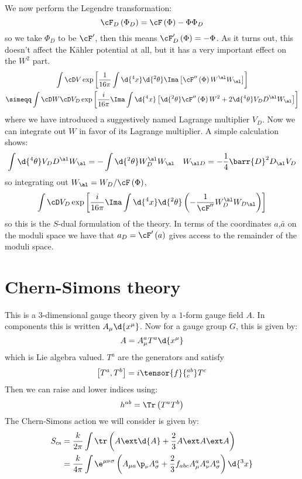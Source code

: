 \documentclass{booc}
\begin{document}
We now perform the Legendre transformation:
\begin{equation}
\cF_D\left( \Phi_D \right) = \cF\left( \Phi \right) - \Phi \Phi_D
\end{equation}
so we take $\Phi_D$ to be $\cF'$,
then this means $\cF'_D\left( \Phi \right) = -\Phi$.
As it turns out, this doesn't affect the K\"ahler potential at all,
but it has a very important effect on the $W^2$ part.
\begin{multline}
\int \cD V
\exp\left[ 
\frac{1}{16\pi}\int \d{^4 x}\d{^2 \theta} \Ima\left[ \cF''\left( \Phi \right)W^\al W_\al \right]\right]
\\ \simeqq
\int \cD W \cD V_D \exp\left[ \frac{i}{16\pi} \Ima\int
\d{^4 x}\left[ \d{^2 \theta} \cF''\left( \Phi \right)W^2 + 2 \d{^4 \theta}V_D D^\al W_\al \right]\right]
\end{multline}
where we have introduced a suggestively named Lagrange multiplier $V_D$.
Now we can integrate out $W$ in favor of its Lagrange multiplier.
A simple calculation shows:
\begin{align}
\int \d{^4 \theta} V_D D^\al W_\al = - \int \d{^2 \theta} W_D^\al W_\al
&&
W_{\al D} = -\frac{1}{4} \barr{D}^2 D_\al V_D
\end{align}
so integrating out $W_\al = W_D/ \cF\left( \Phi \right)$, 
\begin{equation}
\int \cD V_D \exp\left[ \frac{i}{16\pi} \Ima\int \d{^4 x}\d{^2 \theta}
\left( -\frac{1}{\cF ''} W_D^\al W_{D\al} \right)\right]
\end{equation}
so this is the $S$-dual formulation of the theory.
In terms of the coordinates $a$,$\bar a$ on the moduli space
we have that $a_D = \cF'\left( a \right)$
gives access to the remainder of the moduli space.

\section{Chern-Simons theory}

This is a $3$-dimensional
gauge theory given by a $1$-form gauge field $A$.
In components this is written $A_\mu \d{x^\mu}$.
Now for a gauge group $G$, this is given by:
\begin{equation}
A = A_\mu^a T^a \d{x^\mu}
\end{equation}
which is Lie algebra valued.
$T^a$ are the generators and satisfy
\begin{equation}
\left[ T^a , T^b \right] = i \tensor{f}{^{ab}_c} T^c
\end{equation}
Then we can raise and lower indices using:
\begin{equation}
h^{ab} = \Tr\left( T^a T^b \right)
\end{equation}
The Chern-Simons action we will consider is given by:
\begin{align}
S_{\text{cs}} &= \frac{k}{2\pi} \int \tr \left( A\ext \d{A} + \frac{2}{3} A\ext A \ext A \right)\\
&= \frac{k}{4\pi}\int \e^{\mu\nu \sigma} \left( A_{\mu a} \p_\nu A_\sigma^a + 
\frac{2}{3} f_{abc} A_\mu^a A_\nu^a A_\sigma^a \right)\d{^3 x}
\end{align}
\end{document}
